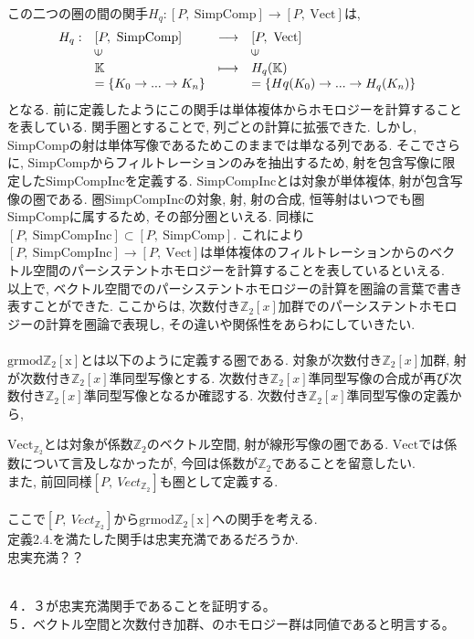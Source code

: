 \documentclass[a4paper]{jsarticle}
\theoremstyle{definition}
\newcommand{\SimpComp}{{\mathrm{SimpComp}}}
\newcommand{\Fun}[2]{[#1,~#2]}
\newcommand{\Vect}{{\mathrm{Vect}}}
\newcommand{\SimpCompInc}{{\mathrm{SimpCompInc}}}
\newcommand{\grmodZ}{{\mathrm{grmod \mathbb{Z}_2[x]}}}
\begin{document}
\noindent\\
この二つの圏の間の関手$H_q:\Fun{P}{\SimpComp}\rightarrow \Fun{P}{\Vect}$は,
\begin{equation}
    \begin{array}{llll}
         H_q:& \Fun{P}{\SimpComp} & \longrightarrow & \Fun{P}{\Vect} \\
        & \rotatebox{90}{$\in$} & & \rotatebox{90}{$\in$} \\
        & \mathbb{K}& \longmapsto & H_q(\mathbb{K})\\
         & =\{K_0\rightarrow ...\rightarrow K_n\} &  & =\{Hq(K_0)\rightarrow ...\rightarrow H_q(K_n)\}\\
    \end{array}
\end{equation}
となる. 前に定義したようにこの関手は単体複体からホモロジーを計算することを表している. 関手圏とすることで, 列ごとの計算に拡張できた. しかし, SimpCompの射は単体写像であるためこのままでは単なる列である. 
そこでさらに, $\SimpComp$からフィルトレーションのみを抽出するため, 射を包含写像に限定した$\SimpCompInc$を定義する. $\SimpCompInc$とは対象が単体複体, 射が包含写像の圏である. 圏SimpCompIncの対象, 射, 射の合成, 恒等射はいつでも圏SimpCompに属するため, その部分圏といえる. 同様に $\Fun{P}{\SimpCompInc}\subset \Fun{P}{\SimpComp}$. これにより$\Fun{P}{\SimpCompInc} \rightarrow \Fun{P}{\Vect}$は単体複体のフィルトレーションからのベクトル空間のパーシステントホモロジーを計算することを表しているといえる. \\

以上で, ベクトル空間でのパーシステントホモロジーの計算を圏論の言葉で書き表すことができた. ここからは, 次数付き$\mathbb{Z}_2[x]$加群でのパーシステントホモロジーの計算を圏論で表現し, その違いや関係性をあらわにしていきたい.\\
\noindent\\
$\grmodZ$とは以下のように定義する圏である. 対象が次数付き$\mathbb{Z}_2[x]$加群, 射が次数付き$\mathbb{Z}_2[x]$準同型写像とする. 次数付き$\mathbb{Z}_2[x]$準同型写像の合成が再び次数付き$\mathbb{Z}_2[x]$準同型写像となるか確認する. 次数付き$\mathbb{Z}_2[x]$準同型写像の定義から,



$\Vect_{\mathbb{Z}_2}$とは対象が係数$\mathbb{Z}_2$のベクトル空間, 射が線形写像の圏である. $\Vect$では係数について言及しなかったが, 今回は係数が$\mathbb{Z}_2$であることを留意したい.\\
また, 前回同様$\Fun{P}{Vect_{\mathbb{Z}_2}}$も圏として定義する.\\
\noindent\\
ここで$\Fun{P}{Vect_{\mathbb{Z}_2}}$から$\grmodZ$への関手を考える.\\
定義2.4.を満たした関手は忠実充満であるだろうか.\\
忠実充満？？






\noindent\\
４．３が忠実充満関手であることを証明する。\\
５．ベクトル空間と次数付き加群、のホモロジー群は同値であると明言する。\\
\end{document}

